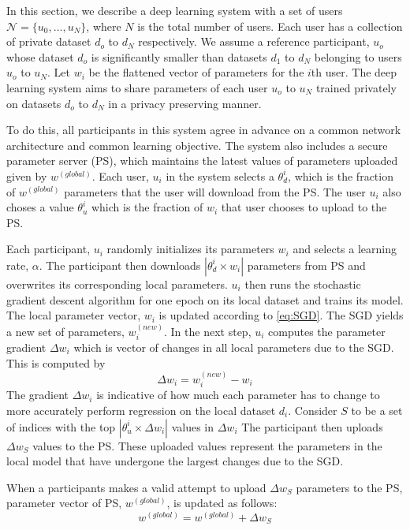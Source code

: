 \documentclass[conference]{IEEEtran}
\begin{document}
In this section, we describe a deep learning system with a set of users $\mathcal{N}= \{u_0, \dots,u_N\}$, where $N$ is the total
number of
users. Each user has a collection of
private dataset $d_o$ to $d_N$ respectively. We assume a reference  participant, $u_o$ whose dataset $d_o$ is significantly smaller
than datasets $d_1$ to $d_N$ belonging to users $u_o$ to $u_N$. Let $w_i$ be the flattened vector of parameters for the $i$th user. The
deep learning system aims to share parameters of each user $u_o$ to $u_N$  trained privately on datasets $d_o$ to $d_N$ in a privacy
preserving manner.

To do this, all participants in this system agree in advance on a
common network architecture and common learning objective. The system also includes a secure parameter server (PS), which maintains the
latest values of parameters uploaded given by $w^{(global)}$. Each user, $u_i$ in the system selects a $\theta_d^{i}$, which is the fraction of  $w^{(global)}$ parameters that the user will download from the PS. 
The user $u_i$ also choses a value $\theta_u^{i}$ which is the fraction of $w_i$ that user chooses to upload to the PS.

Each participant, $u_i$ randomly initializes its parameters $w_i$ and selects a learning rate, $\alpha$.
The participant then downloads $|\theta_d^{i} \times w_i|$ parameters from PS and overwrites its corresponding local parameters.
$u_i$ then runs the stochastic gradient descent algorithm for one epoch on its local dataset and trains its model. The local parameter vector, $w_i$ is updated according to \eqref{eq:SGD}. The SGD yields a new set of parameters, $w_i^{(new)}$.
In the next step, $u_i$ computes the parameter gradient $\Delta w_i$ which is vector of changes in all local parameters due to the SGD. This is computed by
$$\Delta w_i =  w_i^{(new)} -  w_i$$ 
The gradient  $\Delta w_i$ is indicative of how much each parameter has to change to more accurately perform regression on the local dataset $d_i$.
Consider $S$ to be a set of indices with the top  $|\theta_u^{i} \times \Delta w_i|$ values in $\Delta w_i$ 
The participant then uploads  $\Delta w_S$ values to the PS.
These uploaded values represent the parameters in the local model that have undergone the largest changes due to the SGD. 

When a participants makes a valid attempt to upload $\Delta w_S$ parameters to the PS, parameter vector of PS,  $w^{(global)}$, is updated as follows:
$$w^{(global)} =  w^{(global)} +  \Delta w_S$$
\end{document}
